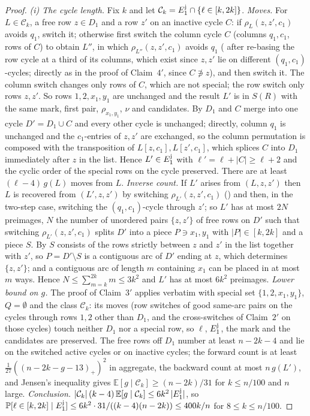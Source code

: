 \documentclass[11pt]{article}
\theoremstyle{definition}
\renewcommand{\Pr}{\mathbb{P}}
\begin{document}
\begin{proof}
\emph{(i) The cycle length.}  Fix $k$ and let $\mathcal C_k=E_1^{\rm j}\cap\{\ell\in[k,2k]\}$.
\emph{Moves.}  For $L\in\mathcal C_k$, a free row $z\in D_1$ and a row $z'$ on an inactive
cycle $C$: if $\rho_L(z,z',c_1)$ avoids $q_1$, switch it; otherwise first switch the column
cycle $C$ (columns $q_1,c_1$, rows of $C$) to obtain $L''$, in which $\rho_{L''}(z,z',c_1)$
avoids $q_1$ (\cite[Lemma~2.3(1)]{AM26} after re-basing the row cycle at a third of its
columns, which exist since $z,z'$ lie on different $(q_1,c_1)$-cycles; directly as in the
proof of Claim~$4'$, since $C\not\ni z$), and then switch it.  The column switch changes
only rows of $C$, which are not special; the row switch only rows $z,z'$.  So rows
$1,2,x_1,y_1$ are unchanged and the result $L'$ is in $S(R)$ with the same mark, first
pair, $\rho_{x_1,y_1}$, $\nu$ and candidates.  By \cite[Lemma~2.4(2)]{AM26} $D_1$ and $C$
merge into one cycle $D'=D_1\cup C$ and every other cycle is unchanged; directly, column
$q_1$ is unchanged and the $c_1$-entries of $z,z'$ are exchanged, so the column permutation
is composed with the transposition of $L[z,c_1],L[z',c_1]$, which splices $C$ into $D_1$
immediately after $z$ in the list.  Hence $L'\in E_1^{\rm j}$ with $\ell'=\ell+|C|\ge\ell+2$
and the cyclic order of the special rows on the cycle preserved.  There are at least
$(\ell-4)\,g(L)$ moves from $L$.
\emph{Inverse count.}  If $L'$ arises from $(L,z,z')$ then $L$ is recovered from $(L',z,z')$
by switching $\rho_{L'}(z,z',c_1)$ (\cite[Fact~2.1]{AM26}) and then, in the two-step case,
switching the $(q_1,c_1)$-cycle through $z'$; so $L'$ has at most $2N$ preimages, $N$ the
number of unordered pairs $\{z,z'\}$ of free rows on $D'$ such that switching
$\rho_{L'}(z,z',c_1)$ splits $D'$ into a piece $P\ni x_1,y_1$ with $|P|\in[k,2k]$ and a
piece $S$.  By \cite[Lemma~2.4(1)]{AM26} $S$ consists of the rows strictly between $z$ and
$z'$ in the list together with $z'$, so $P=D'\setminus S$ is a contiguous arc of $D'$
ending at $z$, which determines $\{z,z'\}$; and a contiguous arc of length $m$ containing
$x_1$ can be placed in at most $m$ ways.  Hence $N\le\sum_{m=k}^{2k}m\le3k^2$ and $L'$ has
at most $6k^2$ preimages.
\emph{Lower bound on $g$.}  The proof of Claim~$3'$ applies verbatim with special set
$\{1,2,x_1,y_1\}$, $Q=\emptyset$ and the class $\mathcal C_k$: its moves (row switches of
good same-arc pairs on the cycles through rows $1,2$ other than $D_1$, and the
cross-switches of Claim~$2'$ on those cycles) touch neither $D_1$ nor a special row, so
$\ell$, $E_1^{\rm j}$, the mark and the candidates are preserved.  The free rows off $D_1$
number at least $n-2k-4$ and lie on the switched active cycles or on inactive cycles; the
forward count is at least $\frac1{27}((n-2k-g-13)_+)^2$ in aggregate, the backward count at
most $n\,g(L')$, and Jensen's inequality gives $\mathbb E[g\mid\mathcal C_k]\ge(n-2k)/31$
for $k\le n/100$ and $n$ large.
\emph{Conclusion.}  $|\mathcal C_k|\,(k-4)\,\mathbb E[g\mid\mathcal C_k]\le6k^2\,|E_1^{\rm j}|$,
so $\Pr[\ell\in[k,2k]\mid E_1^{\rm j}]\le6k^2\cdot31/((k-4)(n-2k))\le400k/n$ for $8\le k\le n/100$.


\end{proof}
\end{document}
